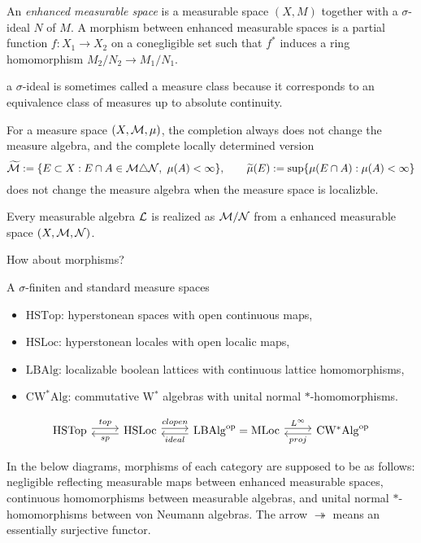 \documentclass{../../large}
\begin{document}
\begin{prb}
An \emph{enhanced measurable space} is a measurable space $(X,M)$ together with a $\sigma$-ideal $N$ of $M$.
A morphism between enhanced measurable spaces is a partial function $f:X_1\to X_2$ on a conegligible set such that $f^*$ induces a ring homomorphism $M_2/N_2\to M_1/N_1$.


a $\sigma$-ideal is sometimes called a measure class because it corresponds to an equivalence class of measures up to absolute continuity.


For a measure space $(X,\mathcal{M},\mu)$, the completion always does not change the measure algebra, and the complete locally determined version
\[\tilde\cM:=\{E\subset X:E\cap A\in\cM\triangle\cN,\ \mu(A)<\infty\},\qquad\tilde\mu(E):=\sup\{\mu(E\cap A):\mu(A)<\infty\}\]
does not change the measure algebra when the measure space is localizble.
\begin{parts}
\item Every measurable algebra $\mathcal{L}$ is realized as $\mathcal{M}/\mathcal{N}$ from a enhanced measurable space $(X,\mathcal{M},\mathcal{N})$.
\item How about morphisms?
\item A $\sigma$-finiten and standard measure spaces
\end{parts}
\end{prb}



\begin{itemize}
\item $\mathrm{HSTop}$: hyperstonean spaces with open continuous maps,
\item $\mathrm{HSLoc}$: hyperstonean locales with open localic maps,
\item $\mathrm{LBAlg}$: localizable boolean lattices with continuous lattice homomorphisms,
\item $\mathrm{CW^*Alg}$: commutative W$^*$ algebras with unital normal $*$-homomorphisms.
\end{itemize}

\[\begin{tikzcd}
\mathrm{HSTop} \rar[shift left]{top}&
\mathrm{HSLoc} \lar[shift left]{sp}\rar[shift left]{clopen}&
\mathrm{LBAlg}^\op=\mathrm{MLoc} \lar[shift left]{ideal}\rar[shift left]{L^\infty}&
\mathrm{CW^*Alg}^\op \lar[shift left]{proj}
\end{tikzcd}\]


In the below diagrams, morphisms of each category are supposed to be as follows: negligible reflecting measurable maps between enhanced measurable spaces, continuous homomorphisms between measurable algebras, and unital normal $*$-homomorphisms between von Neumann algebras.
The arrow $\twoheadrightarrow$ means an essentially surjective functor.
\end{document}
